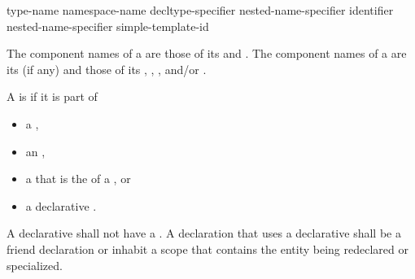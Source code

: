 \documentclass{wg21}
\begin{document}
%
%
%
\begin{bnf}
    \br
    \terminal{::}\br
    type-name \terminal{::}\br
    namespace-name \terminal{::}\br
    decltype-specifier \terminal{::}\br
    \br
    nested-name-specifier identifier \terminal{::}\br
    nested-name-specifier  simple-template-id \terminal{::}
\end{bnf}

\pnum
{}%
The component names of a  are those of
its  and .
The component names of a  are
its  (if any) and those of its
,
,
, and/or
.

\pnum
A  is  if it is part of
\begin{itemize}
    \item
    a ,
    \item
    an ,
    \item
    a 
    that is the  of a , or
    \item
    a declarative .
\end{itemize}
A declarative 
shall not have a .
A declaration that uses a declarative 
shall be a friend declaration or
inhabit a scope that contains the entity being redeclared or specialized.
\end{document}

